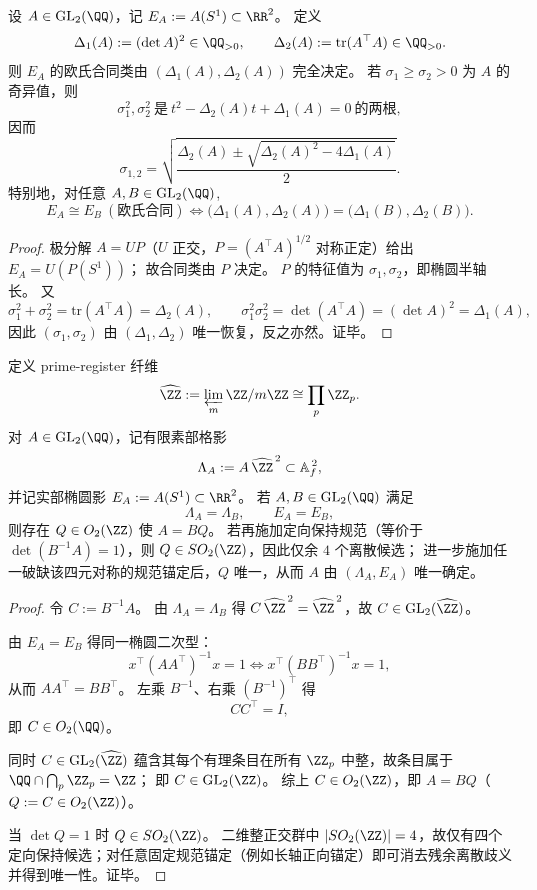 \begin{theorem}[有理椭圆合同类的二元不变量完备性]\label{thm:xi-terminal-rational-ellipse-two-invariant-completeness}
设 \(A\in\mathrm{GL}_2(\QQ)\)，记 \(E_A:=A(S^1)\subset\RR^2\)。
定义
\[
\Delta_1(A):=(\det A)^2\in\QQ_{>0},
\qquad
\Delta_2(A):=\mathrm{tr}(A^\top A)\in\QQ_{>0}.
\]
则 \(E_A\) 的欧氏合同类由 \((\Delta_1(A),\Delta_2(A))\) 完全决定。
若 \(\sigma_1\ge \sigma_2>0\) 为 \(A\) 的奇异值，则
\[
\sigma_1^2,\sigma_2^2\ \text{是}\ t^2-\Delta_2(A)t+\Delta_1(A)=0\ \text{的两根},
\]
因而
\[
\sigma_{1,2}
=\sqrt{\frac{\Delta_2(A)\pm\sqrt{\Delta_2(A)^2-4\Delta_1(A)}}{2}}.
\]
特别地，对任意 \(A,B\in\mathrm{GL}_2(\QQ)\),
\[
E_A\cong E_B\ (\text{欧氏合同})
\Longleftrightarrow
\bigl(\Delta_1(A),\Delta_2(A)\bigr)=\bigl(\Delta_1(B),\Delta_2(B)\bigr).
\]
\end{theorem}
\begin{proof}
极分解 \(A=UP\)（\(U\) 正交，\(P=(A^\top A)^{1/2}\) 对称正定）给出
\(
E_A=U(P(S^1))
\)；
故合同类由 \(P\) 决定。
\(P\) 的特征值为 \(\sigma_1,\sigma_2\)，即椭圆半轴长。
又
\[
\sigma_1^2+\sigma_2^2=\mathrm{tr}(A^\top A)=\Delta_2(A),
\qquad
\sigma_1^2\sigma_2^2=\det(A^\top A)=(\det A)^2=\Delta_1(A),
\]
因此 \((\sigma_1,\sigma_2)\) 由 \((\Delta_1,\Delta_2)\) 唯一恢复，反之亦然。证毕。
\end{proof}



\begin{theorem}[有限素部格与实部椭圆影的二影刚性]\label{thm:xi-terminal-finite-archimedean-two-shadow-rigidity}
定义 prime-register 纤维
\[
\widehat{\ZZ}:=\varprojlim_m \ZZ/m\ZZ\cong\prod_p \ZZ_p.
\]
对 \(A\in\mathrm{GL}_2(\QQ)\)，记有限素部格影
\[
\Lambda_A:=A\,\widehat{\ZZ}^{\,2}\subset \mathbb A_f^{\,2},
\]
并记实部椭圆影 \(E_A:=A(S^1)\subset\RR^2\)。
若 \(A,B\in\mathrm{GL}_2(\QQ)\) 满足
\[
\Lambda_A=\Lambda_B,
\qquad
E_A=E_B,
\]
则存在 \(Q\in O_2(\ZZ)\) 使 \(A=BQ\)。
若再施加定向保持规范（等价于 \(\det(B^{-1}A)=1\)），则 \(Q\in SO_2(\ZZ)\)，因此仅余 \(4\) 个离散候选；
进一步施加任一破缺该四元对称的规范锚定后，\(Q\) 唯一，从而 \(A\) 由 \((\Lambda_A,E_A)\) 唯一确定。
\end{theorem}
\begin{proof}
令 \(C:=B^{-1}A\)。
由 \(\Lambda_A=\Lambda_B\) 得
\(
C\,\widehat{\ZZ}^{\,2}=\widehat{\ZZ}^{\,2}
\)，故 \(C\in\mathrm{GL}_2(\widehat{\ZZ})\)。

由 \(E_A=E_B\) 得同一椭圆二次型：
\[
x^\top(AA^\top)^{-1}x=1
\Longleftrightarrow
x^\top(BB^\top)^{-1}x=1,
\]
从而 \(AA^\top=BB^\top\)。
左乘 \(B^{-1}\)、右乘 \((B^{-1})^\top\) 得
\[
CC^\top=I,
\]
即 \(C\in O_2(\QQ)\)。

同时 \(C\in\mathrm{GL}_2(\widehat{\ZZ})\) 蕴含其每个有理条目在所有 \(\ZZ_p\) 中整，故条目属于
\(
\QQ\cap\bigcap_p\ZZ_p=\ZZ
\)；
即 \(C\in\mathrm{GL}_2(\ZZ)\)。
综上 \(C\in O_2(\ZZ)\)，即 \(A=BQ\)（\(Q:=C\in O_2(\ZZ)\)）。

当 \(\det Q=1\) 时 \(Q\in SO_2(\ZZ)\)。
二维整正交群中 \(|SO_2(\ZZ)|=4\)，故仅有四个定向保持候选；对任意固定规范锚定（例如长轴正向锚定）即可消去残余离散歧义并得到唯一性。证毕。
\end{proof}

